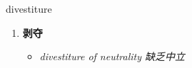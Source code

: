 
\begin{frame}
{\huge divestiture}
\begin{center}
\begin{enumerate}\Large
  \item \textbf{剥夺}
  \begin{itemize}
    \item \em{\Large{divestiture of neutrality 缺乏中立}}
  \end{itemize}
\end{enumerate}
\end{center}
\end{frame}

